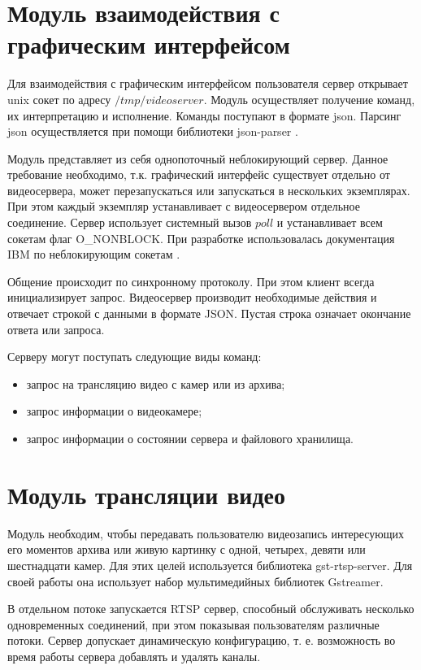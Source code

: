 \section{Модуль взаимодействия с графическим интерфейсом}
Для взаимодействия с графическим интерфейсом пользователя сервер открывает unix сокет
по адресу $/tmp/videoserver$. Модуль осуществляет получение команд, их интерпретацию и исполнение.
Команды поступают в формате json. Парсинг json осуществляется при помощи библиотеки json-parser
\cite{json_parser}.

Модуль представляет из себя однопоточный неблокирующий сервер. Данное требование необходимо, т.к.
графический интерфейс существует отдельно от видеосервера, может перезапускаться или запускаться в
нескольких экземплярах. При этом каждый экземпляр устанавливает с видеосервером отдельное соединение.
Сервер использует системный вызов $poll$ и устанавливает всем сокетам флаг O\_NONBLOCK.
При разработке использовалась документация IBM по неблокирующим сокетам \cite{socket_doc}.

Общение происходит по синхронному протоколу. При этом клиент всегда инициализирует запрос.
Видеосервер производит необходимые действия и отвечает строкой с данными в формате JSON.
Пустая строка означает окончание ответа или запроса.

Серверу могут поступать следующие виды команд:
\smallskip
\begin{itemize}
	\item запрос на трансляцию видео с камер или из архива;
	\item запрос информации о видеокамере;
	\item запрос информации о состоянии сервера и файлового хранилища.
\end{itemize}

\section{Модуль трансляции видео}
Модуль необходим, чтобы передавать пользователю видеозапись интересующих его моментов архива или
живую картинку с одной, четырех, девяти или шестнадцати камер.
Для этих целей используется библиотека gst-rtsp-server. Для своей работы она использует набор
мультимедийных библиотек Gstreamer.

В отдельном потоке запускается RTSP сервер, способный обслуживать несколько одновременных соединений,
при этом показывая пользователям различные потоки.
Сервер допускает динамическую конфигурацию, т. е. возможность во время работы сервера добавлять
и удалять каналы.

